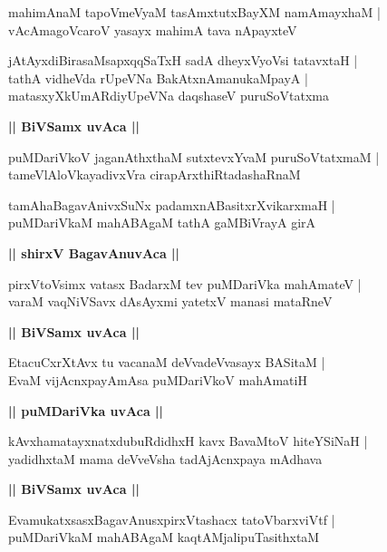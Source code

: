 \documentclass[twoside,12pt,openright]{book}
\newcounter{shloka}[chapter]
\def\uvaca#1{\centerline{{\large\textbf{#1}}}}
\begin{document}
\begin{shloka}%
mahimAnaM tapoVmeVyaM tasAmxtutxBayXM namAmayxhaM |\\
vAcAmagoVcaroV yasayx mahimA tava nApayxteV 
\end{shloka}

\begin{shloka}%
jAtAyxdiBirasaMsapxqqSaTxH sadA dheyxVyoVsi tatavxtaH |\\
tathA vidheVda rUpeVNa BakAtxnAmanukaMpayA |\\
matasxyXkUmARdiyUpeVNa daqshaseV puruSoVtatxma 
\end{shloka}

\uvaca{|| BiVSamx uvAca ||}

\begin{shloka}%
puMDariVkoV jaganAthxthaM sutxtevxYvaM puruSoVtatxmaM |\\
tameVlAloVkayadivxVra cirapArxthiRtadashaRnaM 
\end{shloka}

\begin{shloka}%
tamAhaBagavAnivxSuNx padamxnABasitxrXvikarxmaH |\\
puMDariVkaM mahABAgaM tathA gaMBiVrayA girA
\end{shloka}

\uvaca{|| shirxV BagavAnuvAca ||}

\begin{shloka}%
pirxVtoVsimx vatasx BadarxM tev puMDariVka mahAmateV |\\
varaM vaqNiVSavx dAsAyxmi yatetxV manasi mataRneV 
\end{shloka}

\uvaca{|| BiVSamx uvAca ||}

\begin{shloka}%
EtacuCxrXtAvx tu vacanaM deVvadeVvasayx BASitaM |\\
EvaM vijAcnxpayAmAsa puMDariVkoV mahAmatiH 
\end{shloka}

\uvaca{|| puMDariVka uvAca ||}

\begin{shloka}%
kAvxhamatayxnatxdubuRdidhxH kavx BavaMtoV hiteYSiNaH |\\
yadidhxtaM mama deVveVsha tadAjAcnxpaya mAdhava 
\end{shloka}

\uvaca{|| BiVSamx uvAca ||}

\begin{shloka}%
EvamukatxsasxBagavAnusxpirxVtashacx tatoVbarxviVtf |\\
puMDariVkaM mahABAgaM kaqtAMjalipuTasithxtaM 
\end{shloka}
\end{document}
